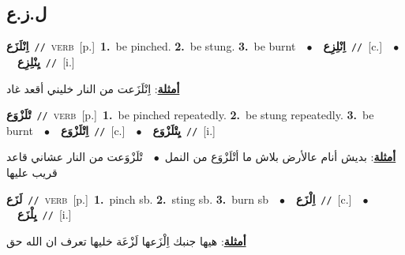 \documentclass[10pt,a4paper,twoside]{article} %
\begin{document}
\begin{multicols}{2}
\vspace{-3mm}
\subsection*{\color{blue}\foreignlanguage{arabic}{ل.ز.ع}\color{blue}{}} 

{\setlength\topsep{0pt}\textbf{\foreignlanguage{arabic}{اِنْلَزَع}}\ {\color{gray}\texttt{//}\color{black}}\ \textsc{verb}\ [p.]\ \textbf{1.}~be pinched.  \textbf{2.}~be stung.  \textbf{3.}~be burnt\ \ $\bullet$\ \ \setlength\topsep{0pt}\textbf{\foreignlanguage{arabic}{اِنْلِزِع}}\ {\color{gray}\texttt{//}\color{black}}\ [c.]\ \ $\bullet$\ \ \setlength\topsep{0pt}\textbf{\foreignlanguage{arabic}{يِنْلِزِع}}\ {\color{gray}\texttt{//}\color{black}}\ [i.]\  \begin{flushright}\color{gray}\foreignlanguage{arabic}{\textbf{\underline{\foreignlanguage{arabic}{أمثلة}}}: اِنْلَزَعت من النار خليني أقعد غاد}\end{flushright}\color{black}} \vspace{2mm}

{\setlength\topsep{0pt}\textbf{\foreignlanguage{arabic}{تْلَزْوَع}}\ {\color{gray}\texttt{//}\color{black}}\ \textsc{verb}\ [p.]\ \textbf{1.}~be pinched repeatedly.  \textbf{2.}~be stung repeatedly.  \textbf{3.}~be burnt\ \ $\bullet$\ \ \setlength\topsep{0pt}\textbf{\foreignlanguage{arabic}{اِتْلَزْوَع}}\ {\color{gray}\texttt{//}\color{black}}\ [c.]\ \ $\bullet$\ \ \setlength\topsep{0pt}\textbf{\foreignlanguage{arabic}{يِتْلَزْوَع}}\ {\color{gray}\texttt{//}\color{black}}\ [i.]\  \begin{flushright}\color{gray}\foreignlanguage{arabic}{\textbf{\underline{\foreignlanguage{arabic}{أمثلة}}}: بديش أنام عالأرض بلاش ما أتْلَزْوَع من النمل\ $\bullet$\ \  تْلَزْوَعت من النار عشاني قاعد قريب عليها}\end{flushright}\color{black}} \vspace{2mm}

{\setlength\topsep{0pt}\textbf{\foreignlanguage{arabic}{لَزَع}}\ {\color{gray}\texttt{//}\color{black}}\ \textsc{verb}\ [p.]\ \textbf{1.}~pinch sb.  \textbf{2.}~sting sb.  \textbf{3.}~burn sb\ \ $\bullet$\ \ \setlength\topsep{0pt}\textbf{\foreignlanguage{arabic}{اِلْزَع}}\ {\color{gray}\texttt{//}\color{black}}\ [c.]\ \ $\bullet$\ \ \setlength\topsep{0pt}\textbf{\foreignlanguage{arabic}{يِلْزَع}}\ {\color{gray}\texttt{//}\color{black}}\ [i.]\  \begin{flushright}\color{gray}\foreignlanguage{arabic}{\textbf{\underline{\foreignlanguage{arabic}{أمثلة}}}: هيها جنبك اِلْزَعها لَزْعَة خليها تعرف ان الله حق}\end{flushright}\color{black}} \vspace{2mm}


\end{multicols}
\end{document}
